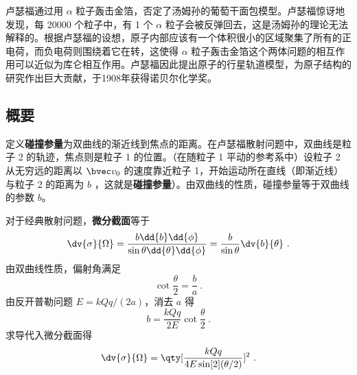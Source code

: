 
卢瑟福通过用 $\alpha$ 粒子轰击金箔，否定了汤姆孙的葡萄干面包模型。卢瑟福惊讶地发现，每 20000 个粒子中，有 1 个 $\alpha$ 粒子会被反弹回去，这是汤姆孙的理论无法解释的。根据卢瑟福的设想，原子内部应该有一个体积很小的区域聚集了所有的正电荷，而负电荷则围绕着它在转，这使得 $\alpha$ 粒子轰击金箔这个两体问题的相互作用可以近似为库仑相互作用。卢瑟福因此提出原子的行星轨道模型，为原子结构的研究作出巨大贡献，于1908年获得诺贝尔化学奖。
\subsection{概要}
定义\textbf{碰撞参量}为双曲线的渐近线到焦点的距离。在卢瑟福散射问题中，双曲线是粒子 2 的轨迹，焦点则是粒子 1 的位置。（在随粒子 1 平动的参考系中）设粒子 2 从无穷远的距离以 $\bvec v_0$ 的速度靠近粒子 1，开始运动所在直线（即渐近线）与粒子 2 的距离为 $b$ ，这就是\textbf{碰撞参量}）。由双曲线的性质，碰撞参量等于双曲线的参数 $b$。

对于经典散射问题，\textbf{微分截面}等于
\begin{equation}
\dv{\sigma}{\Omega} = \frac{b \dd{b}\dd{\phi} }{\sin \theta \dd{\theta} \dd{\phi} } = \frac{b}{\sin \theta }\dv{b}{\theta}~.
\end{equation}
由双曲线性质，偏射角满足
\begin{equation}
\cot{\frac{\theta }{2}}= \frac{b}{a}~.
\end{equation}
由反开普勒问题  $E = kQq/(2a)$，消去 $a$ 得
\begin{equation}
b = \frac{kQq}{2E}\cot {\frac{\theta }{2}}~.
\end{equation}
求导代入微分截面得
\begin{equation}\label{RuthSc_eq1}
\dv{\sigma}{\Omega} = \qty[ \frac{kQq}{4E \sin[2](\theta /2)} ]^2~.
\end{equation}

